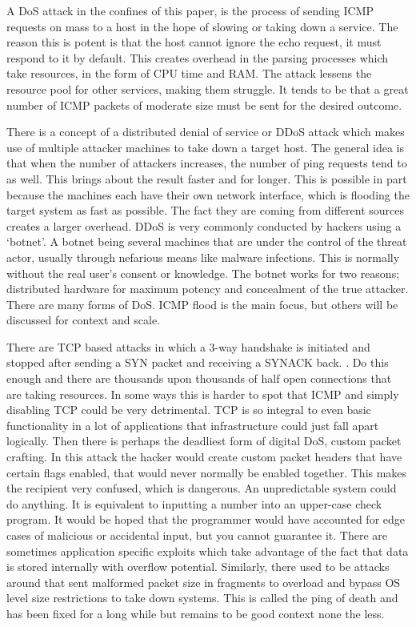 A DoS attack in the confines of this paper, is the process of sending ICMP requests on mass to a host in the hope of slowing or taking down a service. The reason this is potent is that the host cannot ignore the echo request, it must respond to it by default. This creates overhead in the parsing processes which take resources, in the form of CPU time and RAM. The attack lessens the resource pool for other services, making them struggle. 
It tends to be that a great number of ICMP packets of moderate size must be sent for the desired outcome.

There is a concept of a distributed denial of service or DDoS attack which makes use of multiple attacker machines to take down a target host. The general idea is that when the number of attackers increases, the number of ping requests tend to as well. This brings about the result faster and for longer. This is possible in part because the machines each have their own network interface, which is flooding the target system as fast as possible. 
The fact they are coming from different sources creates a larger overhead. DDoS is very commonly conducted by hackers using a ‘botnet’. A botnet being several machines that are under the control of the threat actor, usually through nefarious means like malware infections. This is normally without the real user’s consent or knowledge. The botnet works for two reasons; distributed hardware for maximum potency and concealment of the true attacker. 
There are many forms of DoS. ICMP flood is the main focus, but others will be discussed for context and scale. 

There are TCP based attacks in which a 3-way handshake is initiated and stopped after sending a SYN packet and receiving a SYNACK back. \citep{DoSMit}. 
Do this enough and there are thousands upon thousands of half open connections that are taking resources. In some ways this is harder to spot that ICMP and simply disabling TCP could be very detrimental. TCP is so integral to even basic functionality in a lot of applications that infrastructure could just fall apart logically. \citep{DoSExplained}
Then there is perhaps the deadliest form of digital DoS, custom packet crafting. In this attack the hacker would create custom packet headers that have certain flags enabled, that would never normally be enabled together. This makes the recipient very confused, which is dangerous. An unpredictable system could do anything. It is equivalent to inputting a number into an upper-case check program. 
It would be hoped that the programmer would have accounted for edge cases of malicious or accidental input, but you cannot guarantee it. There are sometimes application specific exploits which take advantage of the fact that data is stored internally with overflow potential. Similarly, there used to be attacks around that sent malformed packet size in fragments to overload and bypass OS level size restrictions to take down systems. 
This is called the ping of death and has been fixed for a long while but remains to be good context none the less. \citep{ICMPFloodDetPrev}

